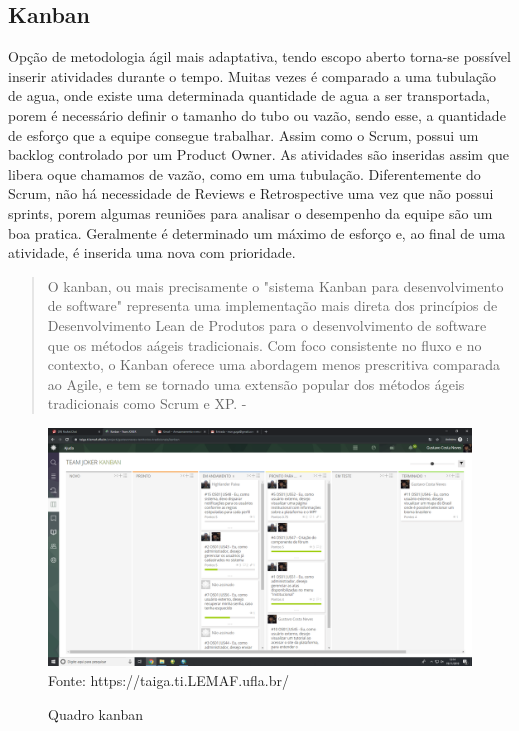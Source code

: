 \subsection{Kanban}
Opção de metodologia ágil mais adaptativa, tendo escopo aberto torna-se possível inserir atividades durante o tempo.
Muitas vezes é comparado a uma tubulação de agua, onde existe uma determinada quantidade de agua a ser transportada, porem é necessário definir o tamanho do tubo ou vazão, sendo esse, a quantidade de esforço que a equipe consegue trabalhar.
Assim como o Scrum, possui um backlog controlado por um Product Owner. As atividades são inseridas assim que libera oque chamamos de vazão, como em uma tubulação.
Diferentemente do Scrum, não há necessidade de Reviews e Retrospective uma vez que não possui sprints, porem algumas reuniões para analisar o desempenho da equipe são um boa pratica.
Geralmente é determinado um máximo de esforço e, ao final de uma atividade, é inserida uma nova com prioridade.


  \begin{quote}
    O kanban, ou mais precisamente o "sistema Kanban para desenvolvimento de software" representa uma implementação mais direta dos princípios de Desenvolvimento Lean de Produtos para o desenvolvimento de software que os métodos aágeis tradicionais. Com foco consistente no fluxo e no contexto, o Kanban oferece uma abordagem menos prescritiva comparada ao Agile, e tem se tornado uma extensão popular dos métodos ágeis tradicionais como Scrum e XP. - \cite{boeg2010kanban}
  \end{quote}
\begin{figure}[H]
\centering
\caption{Quadro kanban} %
\includegraphics[scale=0.2]{quadroKanban}\\  %
{\small Fonte: https://taiga.ti.LEMAF.ufla.br/} %
\label{fig:exemplo} %
\end{figure}

